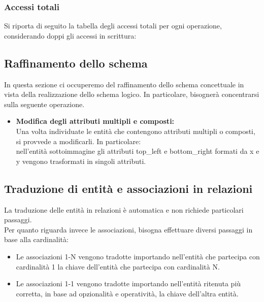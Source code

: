 \documentclass[a4paper,final,12pt]{report}
\begin{document}
\subsubsection{Accessi totali}
Si riporta di seguito la tabella degli accessi totali per ogni operazione, considerando doppi gli accessi in scrittura:
\begin{table}[hbtp]
\centering
{}
\end{table}

\subsection{Raffinamento dello schema}
In questa sezione ci occuperemo del raffinamento dello schema concettuale in vista della realizzazione dello schema logico. In particolare, bisognerà concentrarsi sulla seguente operazione.

\begin{itemize}
\item \textbf{Modifica degli attributi multipli e composti:}\\
Una volta individuate le entità che contengono attributi multipli o composti, si provvede a modificarli. In particolare: \\ 
nell'entità sottoimmagine gli attributi top\_left e bottom\_right formati da x e y vengono trasformati in singoli attributi.
\end{itemize}

\subsection{Traduzione di entità e associazioni in relazioni}
La traduzione delle entità in relazioni è automatica e non richiede particolari passaggi.\\
Per quanto riguarda invece le associazioni, bisogna effettuare diversi passaggi in base alla cardinalità:
\begin{itemize}
\item  Le associazioni 1-N vengono tradotte importando nell'entità che partecipa con cardinalità 1 la chiave dell'entità che partecipa con cardinalità N.
\item Le associazioni 1-1 vengono tradotte importando nell'entità ritenuta più corretta, in base ad opzionalità e operatività, la chiave dell'altra entità.
\end{itemize}
\end{document}
